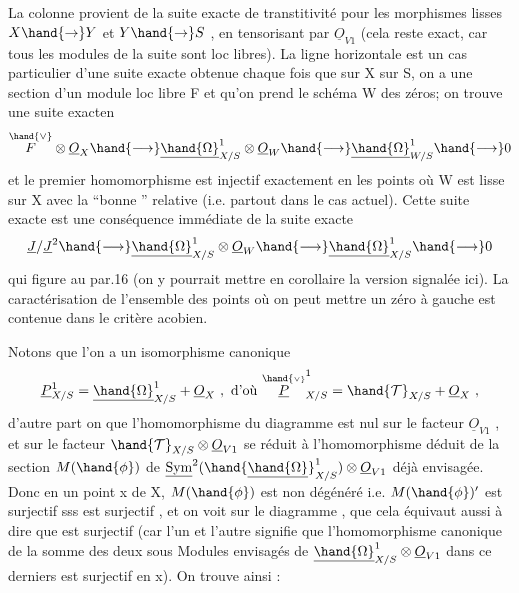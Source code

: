 
La colonne provient de la suite exacte de transtitivité pour les
morphismes lisses $X\hand{\to} Y$ et $Y\hand{\to} S$ , en  tensorisant par $\underline{O}_{V1}$ (cela reste
exact, car tous les modules de la suite sont loc libres). La ligne
horizontale est un cas particulier d'une suite exacte obtenue chaque
fois que sur X  sur S, on a une section \hand{$\mu$} d'un module loc libre F
et qu'on prend le schéma W des zéros; on trouve une suite exacten
\[ \overset{\hand{\vee}}{F}\otimes \underline{O}_X \hand{\longrightarrow} \underline{\hand{\Omega}}^1_{X/S}\otimes \underline{O}_W \hand{\longrightarrow} \underline{\hand{\Omega}}^1_{W/S} \hand{\longrightarrow} 0 \]
et  le premier homomorphisme est injectif exactement en les points où
W est lisse sur X avec la ``bonne ''  relative (i.e. partout dans
le cas actuel).  Cette suite exacte est 
  une
conséquence immédiate de la suite exacte
\[ \underline{J}/\underline{J}^2\hand{\longrightarrow} \underline{\hand{\Omega}}^1_{X/S}\otimes \underline{O}_W \hand{\longrightarrow} \underline{\hand{\Omega}}^1_{X/S} \hand{\longrightarrow} 0 \]
\margin{16 \textbar} qui figure au par.16 (on y pourrait mettre en corollaire la version
signalée ici). La caractérisation de l'ensemble des points où on
peut mettre un zéro à gauche est contenue dans le critère acobien.

Notons que l'on a un isomorphisme canonique
\[ \underline{P}^1_{X/S} = \underline{\hand{\Omega}}^1_{X/S} + \underline{O}_X \ ,\ \text{d'où}\ \overset{\hand{\scriptscriptstyle\vee}}{\underline{P}}^1_{X/S} = \hand{\mathcal{T}}_{X/S} + \underline{O}_X \ , \]
d'autre part on  que l'homomorphisme  \hand{$\mu$} du diagramme  est nul
sur le facteur $\underline{O}_{V1}$ , et sur le facteur $\hand{\mathcal{T}}_{X/S}\otimes\underline{O}_{V1}$  se réduit à
l'homomorphisme  déduit de la section $M(\hand{\phi})$ de $\underline{\mathrm{Sym}}^2(\hand{\underline{\hand{\Omega}}}^1_{X/S})\otimes \underline{O}_{V1}$ déjà
envisagée. Donc en un point x de X, $M(\hand{\phi})$ est non dégénéré i.e. $M(\hand{\phi})'$
est surjectif sss \hand{$\mu$} est surjectif , et on voit sur le diagramme ,
que cela équivaut aussi à dire que \hand{$\nu$} est surjectif  (car l'un et l'autre
signifie que l'homomorphisme canonique de la somme des deux sous
Modules envisagés de $\underline{\hand{\Omega}}^1_{X/S}\otimes \underline{O}_{V1}$ dans ce derniers est surjectif en
x). On trouve ainsi :

